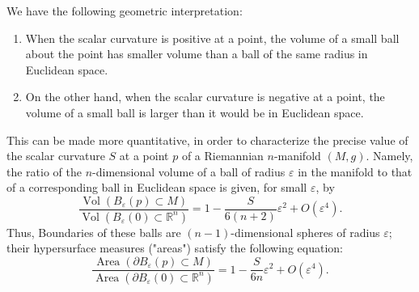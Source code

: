\documentclass[12pt]{article} %
\begin{document}
\begin{enumerate}[label=\textbf{\arabic*})]
We have the following  geometric interpretation: 
\begin{enumerate}
    \item When the scalar curvature is positive at a point, the volume of a small ball about the point has smaller volume than a ball of the same radius in Euclidean space.
    \item On the other hand, when the scalar curvature is negative at a point, the volume of a small ball is larger than it would be in Euclidean space.
\end{enumerate}
\begin{rema}
This can be made more quantitative, in order to characterize the precise value of the scalar curvature $S$ at a point $p$ of a Riemannian $n$-manifold $(M, g)$. Namely, the ratio of the $n$-dimensional volume of a ball of radius $\varepsilon$ in the manifold to that of a corresponding ball in Euclidean space is given, for small $\varepsilon$, by
$$
\frac{\operatorname{Vol}\left(B_{\varepsilon}(p) \subset M\right)}{\operatorname{Vol}\left(B_{\varepsilon}(0) \subset \mathbb{R}^{n}\right)}=1-\frac{S}{6(n+2)} \varepsilon^{2}+O\left(\varepsilon^{4}\right) .
$$
Thus, 
Boundaries of these balls are $(n-1)$-dimensional spheres of radius $\varepsilon$; their hypersurface measures ("areas") satisfy the following equation:
$$
\frac{\operatorname{Area}\left(\partial B_{\varepsilon}(p) \subset M\right)}{\operatorname{Area}\left(\partial B_{\varepsilon}(0) \subset \mathbb{R}^{n}\right)}=1-\frac{S}{6 n} \varepsilon^{2}+O\left(\varepsilon^{4}\right) .
$$
\end{rema}
\end{enumerate}
\end{document}
